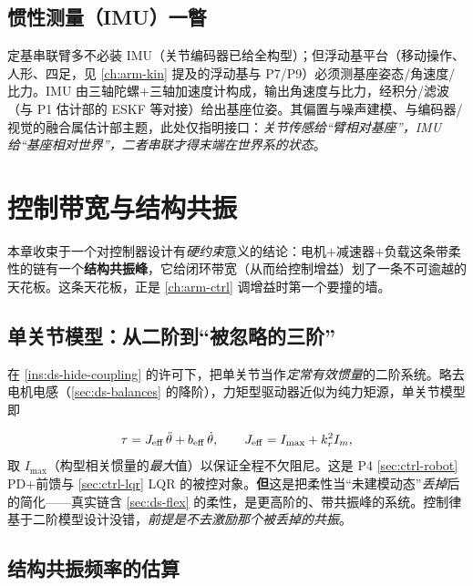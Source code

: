 \subsection{惯性测量（IMU）一瞥}
\label{sec:ds-imu}

定基串联臂多不必装 IMU（关节编码器已给全构型）；但浮动基平台（移动操作、人形、四足，见 \cref{ch:arm-kin} 提及的浮动基与 P7/P9）必须测基座姿态/角速度/比力。IMU 由三轴陀螺$+$三轴加速度计构成，输出角速度与比力，经积分/滤波（与 P1 估计部的 ESKF 等对接）给出基座位姿。其偏置与噪声建模、与编码器/视觉的融合属估计部主题，此处仅指明接口：\emph{关节传感给“臂相对基座”，IMU 给“基座相对世界”，二者串联才得末端在世界系的状态}。

\section{控制带宽与结构共振}
\label{sec:ds-bandwidth}

本章收束于一个对控制器设计有\emph{硬约束}意义的结论：电机$+$减速器$+$负载这条带柔性的链有一个\textbf{结构共振峰}，它给闭环带宽（从而给控制增益）划了一条不可逾越的天花板。这条天花板，正是 \cref{ch:arm-ctrl} 调增益时第一个要撞的墙。

\subsection{单关节模型：从二阶到“被忽略的三阶”}
\label{sec:ds-singlejoint}

在 \cref{ins:ds-hide-coupling} 的许可下，把单关节当作\emph{定常有效惯量}的二阶系统。略去电机电感（\cref{sec:ds-balances} 的降阶），力矩型驱动器近似为纯力矩源，单关节模型即

\begin{equation}
\tau = J_{\rm eff}\,\ddot\theta + b_{\rm eff}\,\dot\theta,\qquad J_{\rm eff}=I_{\max}+k_r^2 I_m,
\label{eq:ds-singlejoint}
\end{equation}
取 $I_{\max}$（构型相关惯量的\emph{最大}值）以保证全程不欠阻尼\cite{craig2005introduction}。这是 P4 \cref{sec:ctrl-robot} PD$+$前馈与 \cref{sec:ctrl-lqr} LQR 的被控对象。\textbf{但}这是把柔性当“未建模动态”\emph{丢掉}后的简化——真实链含 \cref{sec:ds-flex} 的柔性，是更高阶的、带共振峰的系统。控制律基于二阶模型设计没错，\emph{前提是不去激励那个被丢掉的共振}。

\subsection{结构共振频率的估算}
\label{sec:ds-resfreq}


